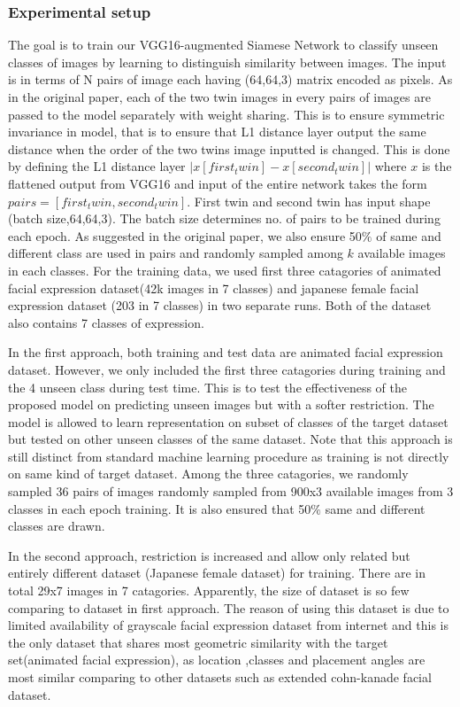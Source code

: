 \documentclass{article}
\begin{document}
\subsubsection{\textbf{Experimental setup}}

The goal is to train our VGG16-augmented Siamese Network to classify unseen classes of images by learning to distinguish similarity between images. The input is in terms of N pairs of image each having (64,64,3) matrix encoded as pixels. As in the original paper, each of the two twin images in every pairs of images are passed to the model separately with weight sharing. This is to ensure symmetric invariance in model, that is to ensure that L1 distance layer output the same distance when the order of the two twins image inputted is changed. This is done by defining the L1 distance layer $|x[first_twin] - x[second_twin]|$ where $x$ is the flattened output from VGG16 and input of the entire network takes the form $pairs=[first_twin,second_twin]$. First twin and second twin has input shape (batch size,64,64,3). The batch size determines no. of pairs to be trained during each epoch. As suggested in the original paper, we also ensure 50$\%$ of same and different class are used in pairs and randomly sampled among $k$ available images in each classes. For the training data, we used first three catagories of animated facial expression dataset(42k images in 7 classes) and japanese female facial expression dataset (203 in 7 classes) in two separate runs. Both of the dataset also contains 7 classes of expression.

In the first approach, both training and test data are animated facial expression dataset. However, we only included the first three catagories during training and the 4 unseen class during test time. This is to test the effectiveness of the proposed model on predicting unseen images but with a softer restriction. The model is allowed to learn representation on subset of classes of the target dataset but tested on other unseen classes of the same dataset. Note that this approach is still distinct from standard machine learning procedure as training is not directly on same kind of target dataset. Among the three catagories, we randomly sampled 36 pairs of images randomly sampled from 900x3 available images from 3 classes in each epoch training. It is also ensured that 50$\%$ same and different classes are drawn.

In the second approach, restriction is increased and allow only related but entirely different dataset (Japanese female dataset) for 
training. There are in total 29x7 images in 7 catagories. Apparently, the size of dataset is so few comparing to dataset in first
approach. The reason of using this dataset is due to limited availability of grayscale facial expression dataset from internet and this is the only dataset that shares most geometric similarity with the target set(animated facial expression), as location ,classes and placement angles are most similar comparing to other datasets such as extended cohn-kanade facial dataset.
\end{document}
